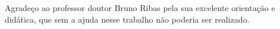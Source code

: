 \begin{agradecimentos}

Agradeço ao professor doutor Bruno Ribas pela sua excelente orientação e didática, que sem a ajuda nesse trabalho não poderia ser realizado.  

\textbf{}
\end{agradecimentos}
